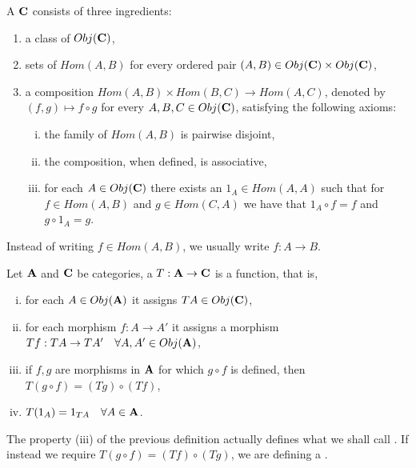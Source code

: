 \documentclass[../1.tex]{subfiles}
\begin{document}
    \begin{defn}
        A  $\textbf{C}$ consists of three ingredients:
        \begin{enumerate}[1.]
            \item a class of  $Obj(\textbf{C})$,
            \item sets of  $Hom(A,B)$ for every ordered pair $(A,B) \in Obj(\textbf{C}) \times Obj(\textbf{C})$,
            \item a composition $Hom(A,B) \times Hom(B,C) \to Hom(A,C)$, denoted by $(f,g) \mapsto f \circ g$ for every $A,B,C \in Obj(\textbf{C})$, satisfying the following axioms:
            \begin{enumerate}[(i)]
                \item the family of $Hom(A,B)$ is pairwise disjoint,
                \item the composition, when defined, is associative,
                \item for each $A \in Obj(\textbf{C})$ there exists an  $1_A \in Hom(A,A)$ such that for $f \in Hom(A,B)$ and $g \in Hom(C,A)$ we have that $1_A \circ f = f$ and $g \circ 1_A = g$.
            \end{enumerate}
        \end{enumerate}
    \end{defn}

    Instead of writing $f \in Hom(A,B)$, we usually write $f : A \to B$. 

    \begin{defn}
        Let $\textbf{A}$ and $\textbf{C}$ be categories, a  $T : \textbf{A} \to \textbf{C}$ is a function, that is, 
        \begin{enumerate}[(i)]
            \item for each $A \in Obj(\textbf{A})$ it assigns $TA \in Obj(\textbf{C})$,
            \item for each morphism $f:A \to A'$ it assigns a morphism $Tf: TA \to TA' \quad \forall A,A' \in Obj(\textbf{A})$,
            \item if $f,g$ are morphisms in $\textbf{A}$ for which $g \circ f$ is defined, then $T(g \circ f) = (Tg) \circ (Tf)$,
            \item $T(1_A)= 1_{TA} \quad \forall A \in \textbf{A}$.
        \end{enumerate}
    \end{defn}

    The property (iii) of the previous definition actually defines what we shall call .
    If instead we require $T(g \circ f) = (Tf) \circ (Tg)$, we are defining a .
\end{document}
